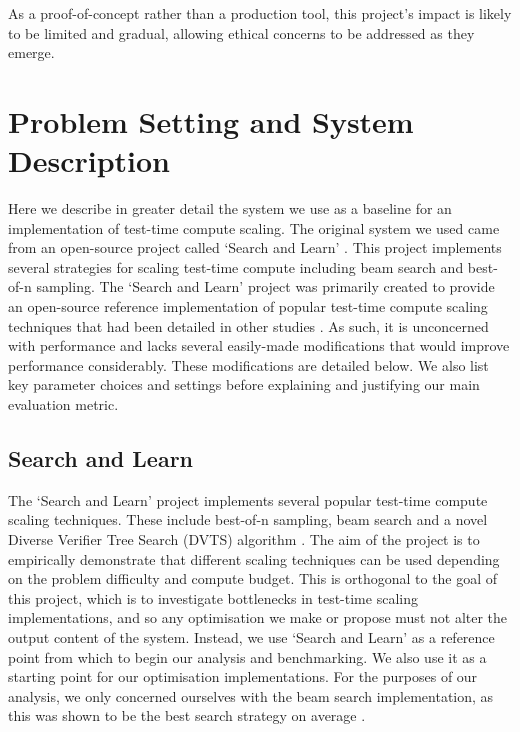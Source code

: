 \documentclass[12pt,twoside]{report}
\begin{document}
As a proof-of-concept rather than a production tool, this project’s impact is likely to be limited and gradual, allowing ethical concerns to be addressed as they emerge.

\chapter{Problem Setting and System Description}

Here we describe in greater detail the system we use as a baseline for an implementation of test-time compute scaling. 
The original system we used came from an open-source project called `Search and Learn' \cite{beeching2024scalingtesttimecompute}.
This project implements several strategies for scaling test-time compute including beam search and best-of-n sampling. 
The `Search and Learn' project was primarily created to provide an open-source reference implementation of popular test-time compute scaling techniques that had been detailed in other studies \cite{snell2024scaling}.
As such, it is unconcerned with performance and lacks several easily-made modifications that would improve performance considerably.
These modifications are detailed below. 
We also list key parameter choices and settings before explaining and justifying our main evaluation metric.

\section{Search and Learn}
The `Search and Learn' project implements several popular test-time compute scaling techniques. 
These include best-of-n sampling, beam search and a novel Diverse Verifier Tree Search (DVTS) algorithm \cite{beeching2024scalingtesttimecompute}.
The aim of the project is to empirically demonstrate that different scaling techniques can be used depending on the problem difficulty and compute budget.
This is orthogonal to the goal of this project, which is to investigate bottlenecks in test-time scaling implementations, and so any optimisation we make or propose must not alter the output content of the system. 
Instead, we use `Search and Learn' as a reference point from which to begin our analysis and benchmarking.
We also use it as a starting point for our optimisation implementations.
For the purposes of our analysis, we only concerned ourselves with the beam search implementation, as this was shown to be the best search strategy on average \cite{beeching2024scalingtesttimecompute}.
\end{document}
